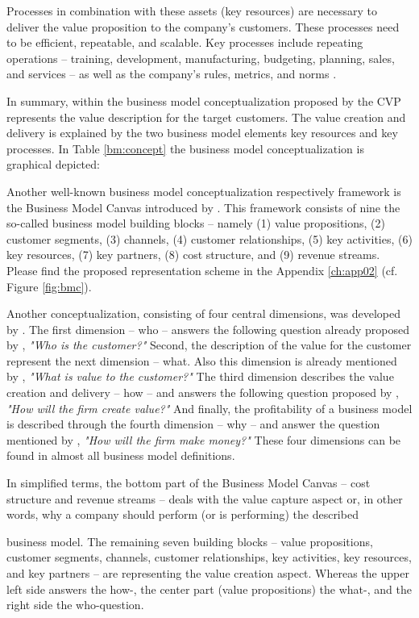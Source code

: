 Processes in combination with these assets (key resources) are necessary to deliver the value proposition to the company's customers. These processes need to be efficient, repeatable, and scalable. Key processes include repeating operations -- training, development, manufacturing, budgeting, planning, sales, and services -- as well as the company's rules, metrics, and norms \citep[p. 53]{Johnson2008}.

In summary, within the business model conceptualization proposed by \citet[p. 54]{Johnson2008} the \ac{CVP} represents the value description for the target customers. The value creation and delivery is explained by the two business model elements key resources and key processes. In Table \ref{bm:concept} the business model conceptualization is graphical depicted:

%

Another well-known business model conceptualization respectively framework is the Business Model Canvas introduced by \citet{Osterwalder2010}. This framework consists of nine the so-called business model building blocks -- namely (1) value propositions, (2) customer segments, (3) channels, (4) customer relationships, (5) key activities, (6) key resources, (7) key partners, (8) cost structure, and (9) revenue streams. Please find the proposed representation scheme in the Appendix \ref{ch:app02} (cf. Figure \ref{fig:bmc}).

Another conceptualization, consisting of four central dimensions, was developed by \citet{Frankenberger2013}. The first dimension -- who -- answers the following question already proposed by \citet[pp. 49-61]{Drucker1954}, \textit{"Who is the customer?"} Second, the description of the value for the customer represent the next dimension -- what. Also this dimension is already mentioned by \citet[pp. 49-61]{Drucker1954}, \textit{"What is value to the customer?"} The third dimension describes the value creation and delivery -- how -- and answers the following question proposed by \citet[pp. 729-732]{Morris2005}, \textit{"How will the firm create value?"} And finally, the profitability of a business model is described through the fourth dimension -- why -- and answer the question mentioned by \citet[pp. 729-732]{Morris2005}, \textit{"How will the firm make money?"} These four dimensions can be found in almost all business model definitions.

In simplified terms, the bottom part of the Business Model Canvas -- cost structure and revenue streams -- deals with the value capture aspect or, in other words, why a company should perform (or is performing) the described\linebreak 
 
\noindent business model. The remaining seven building blocks -- value propositions, customer segments, channels, customer relationships, key activities, key resources, and key partners -- are representing the value creation aspect. Whereas the upper left side answers the how-, the center part (value propositions) the what-, and the right side the who-question. 


